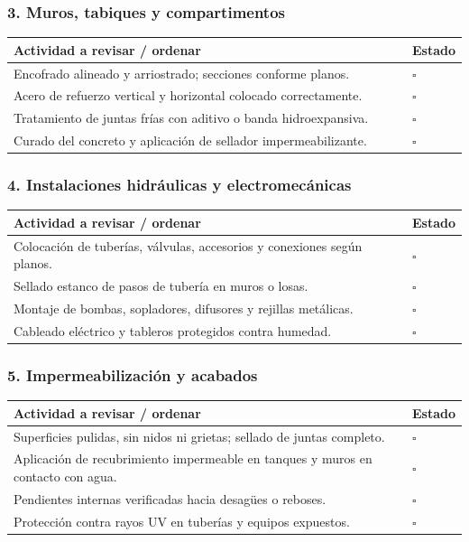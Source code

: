 \documentclass[12pt]{article}
\newcommand{\cbox}{\(\square\)} %
\begin{document}
	\subsubsection*{3. Muros, tabiques y compartimentos}
	\begin{tabularx}{\linewidth}{>{\raggedright\arraybackslash}p{0.93\linewidth} >{\centering\arraybackslash}m{0.07\linewidth}}
		\toprule
		\textbf{Actividad a revisar / ordenar} & \textbf{Estado}\\
		\midrule
		Encofrado alineado y arriostrado; secciones conforme planos. & \cbox \\
		Acero de refuerzo vertical y horizontal colocado correctamente. & \cbox \\
		Tratamiento de juntas frías con aditivo o banda hidroexpansiva. & \cbox \\
		Curado del concreto y aplicación de sellador impermeabilizante. & \cbox \\
		\bottomrule
	\end{tabularx}
	
	\subsubsection*{4. Instalaciones hidráulicas y electromecánicas}
	\begin{tabularx}{\linewidth}{>{\raggedright\arraybackslash}p{0.93\linewidth} >{\centering\arraybackslash}m{0.07\linewidth}}
		\toprule
		\textbf{Actividad a revisar / ordenar} & \textbf{Estado}\\
		\midrule
		Colocación de tuberías, válvulas, accesorios y conexiones según planos. & \cbox \\
		Sellado estanco de pasos de tubería en muros o losas. & \cbox \\
		Montaje de bombas, sopladores, difusores y rejillas metálicas. & \cbox \\
		Cableado eléctrico y tableros protegidos contra humedad. & \cbox \\
		\bottomrule
	\end{tabularx}
	
	\subsubsection*{5. Impermeabilización y acabados}
	\begin{tabularx}{\linewidth}{>{\raggedright\arraybackslash}p{0.93\linewidth} >{\centering\arraybackslash}m{0.07\linewidth}}
		\toprule
		\textbf{Actividad a revisar / ordenar} & \textbf{Estado}\\
		\midrule
		Superficies pulidas, sin nidos ni grietas; sellado de juntas completo. & \cbox \\
		Aplicación de recubrimiento impermeable en tanques y muros en contacto con agua. & \cbox \\
		Pendientes internas verificadas hacia desagües o reboses. & \cbox \\
		Protección contra rayos UV en tuberías y equipos expuestos. & \cbox \\
		\bottomrule
	\end{tabularx}
	
\end{document}
